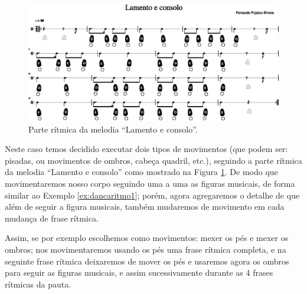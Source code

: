 \begin{figure}
    \centering
    \includegraphics[width=\textwidth]{chapters/cap-musicalidade-tecnica/lamento-e-consolo-clave-ritmo2-1.eps}
    \caption{Parte rítmica da melodia ``Lamento e consolo''.}
    \label{fig:lamentoconsoloritmo2}
\end{figure}

\begin{example}
\label{ex:dancaritmo1macro}
Neste caso temos decidido executar dois tipos de movimentos 
(que podem ser: pisadas, ou movimentos de ombros, cabeça quadril, etc.),
seguindo a parte rítmica da melodia ``Lamento e consolo'' como mostrado na Figura \ref{fig:lamentoconsoloritmo2}.
De modo que movimentaremos nosso corpo seguindo uma a uma as figuras musicais, 
de forma similar ao Exemplo \ref{ex:dancaritmo1}; porém, 
agora  agregaremos o detalhe de que além de seguir a figura musicais,
também mudaremos de movimento em cada mudança de frase rítmica.

Assim, se por exemplo escolhemos como movimentos:
mexer os pés e mexer os ombros; nos movimentaremos usando os pés uma frase rítmica completa,
e na seguinte frase rítmica deixaremos de mover os pés e 
usaremos agora os ombros para seguir as figuras musicais,
e assim sucessivamente durante as 4 frases rítmicas da pauta. 
\end{example}

